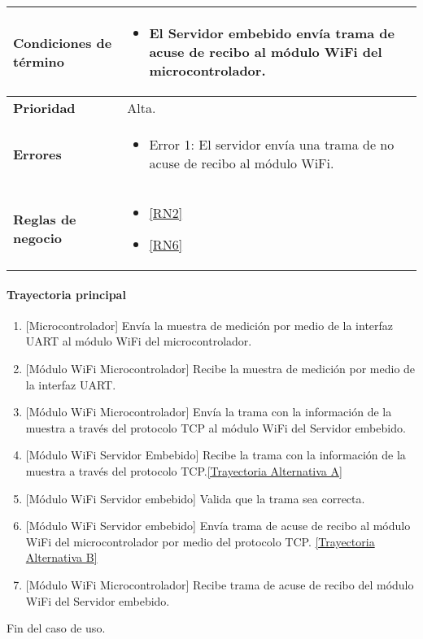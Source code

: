 \begin{longtable}{|J{5cm}|J{10.3cm}|}
	\textbf{Condiciones de término} & 
		\begin{itemize}
		    \item El Servidor embebido envía trama de acuse de recibo al módulo WiFi del microcontrolador.
		\end{itemize} 
		\\ \hline 
	\textbf{Prioridad} & 
		Alta. \\ \hline
	\textbf{Errores} &
		 \begin{itemize}
		 	\item \label{SUB-M-CU1.4:Error1} Error 1: El servidor envía una trama de no acuse de recibo al módulo WiFi.
		 \end{itemize} \\ 
		 \hline
	\textbf{Reglas de negocio} & 
	    \begin{itemize}
	      \item  \ref{RN2}
	      \item  \ref{RN6}
		 \end{itemize}%
		 \hline
\end{longtable}

\paragraph{Trayectoria principal}
\label{SUB-M-CU1.4:TP}
	\begin{enumerate}
	    \item {[Microcontrolador]} Envía la muestra de medición por medio de la interfaz UART al módulo WiFi del microcontrolador.
	    \item {[Módulo WiFi Microcontrolador]} Recibe la muestra de medición por medio de la interfaz UART.
	    \item {[Módulo WiFi Microcontrolador]} Envía la trama con la información de la muestra a través del protocolo TCP al módulo WiFi del Servidor embebido.
	    \item {[Módulo WiFi Servidor Embebido]} Recibe la trama con la información de la muestra a través del protocolo TCP.\hyperref[SUB-M-CU1.4:TA]{[Trayectoria Alternativa A]}
	    \item {[Módulo WiFi Servidor embebido]} Valida que la trama sea correcta. 
	    \item {[Módulo WiFi Servidor embebido]} Envía trama de acuse de recibo al módulo WiFi del microcontrolador por medio del protocolo TCP. \hyperref[SUB-M-CU1.4:TB]{[Trayectoria Alternativa B]}
	    \item {[Módulo WiFi Microcontrolador]} Recibe trama de acuse de recibo del módulo WiFi del Servidor embebido.
	\end{enumerate}
	Fin del caso de uso.


